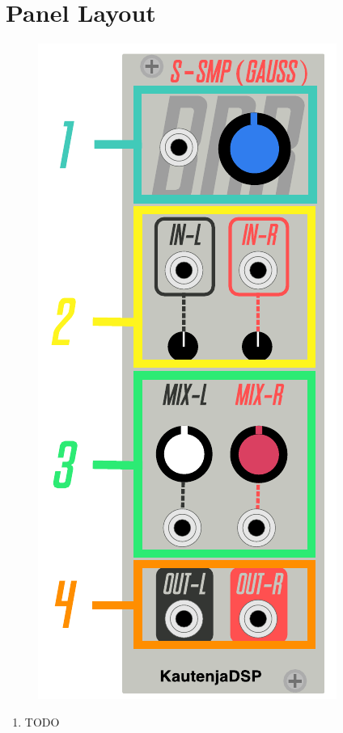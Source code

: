 \documentclass[12pt,letter]{article}
\begin{document}

\clearpage
\section{Panel Layout}

\begin{figure}[!htp]
\centering
\includegraphics{S-SMP-Gauss-Manual}
\end{figure}

\clearpage
\begin{enumerate}
  \item TODO
\end{enumerate}


\clearpage
\renewcommand\refname{References \& Acknowledgments}
\nocite{*}


\end{document}
